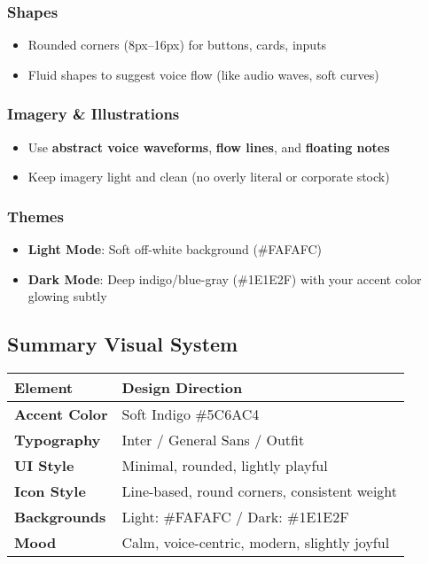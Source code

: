 \subsubsection{Shapes}
\begin{itemize}
    \item Rounded corners (8px–16px) for buttons, cards, inputs
    \item Fluid shapes to suggest voice flow (like audio waves, soft curves)
\end{itemize}

\subsubsection{Imagery \& Illustrations}
\begin{itemize}
    \item Use \textbf{abstract voice waveforms}, \textbf{flow lines}, and \textbf{floating notes}
    \item Keep imagery light and clean (no overly literal or corporate stock)
\end{itemize}

\subsubsection{Themes}
\begin{itemize}
    \item \textbf{Light Mode}: Soft off-white background (\#FAFAFC)
    \item \textbf{Dark Mode}: Deep indigo/blue-gray (\#1E1E2F) with your accent color glowing subtly
\end{itemize}

\subsection{Summary Visual System}
\begin{tabular}{|l|l|}
\hline
\textbf{Element} & \textbf{Design Direction} \\
\hline
\textbf{Accent Color} & Soft Indigo \#5C6AC4 \\
\hline
\textbf{Typography} & Inter / General Sans / Outfit \\
\hline
\textbf{UI Style} & Minimal, rounded, lightly playful \\
\hline
\textbf{Icon Style} & Line-based, round corners, consistent weight \\
\hline
\textbf{Backgrounds} & Light: \#FAFAFC / Dark: \#1E1E2F \\
\hline
\textbf{Mood} & Calm, voice-centric, modern, slightly joyful \\
\hline
\end{tabular}
